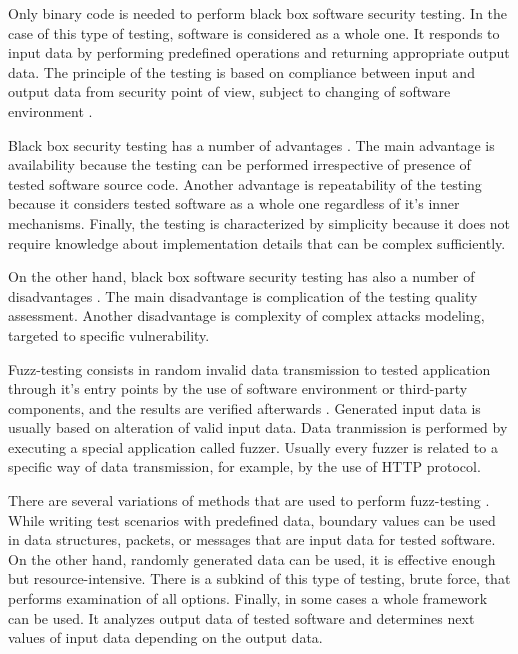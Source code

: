 %
Only binary code is needed to perform black box software security testing. 
%
In the case of this type of testing, software is considered as a whole one. 
%
It responds to input data by performing predefined operations and returning appropriate output data. 
%
The principle of the testing is based on compliance between input and output data from security point of view, subject to changing of software environment . 

%
Black box security testing has a number of advantages . 
%
The main advantage is availability because the testing can be performed irrespective of presence of tested software source code. 
%
Another advantage is repeatability of the testing because it considers tested software as a whole one regardless of it's inner mechanisms. 
%
Finally, the testing is characterized by simplicity because it does not require knowledge about implementation details that can be complex sufficiently. 

%
On the other hand, black box software security testing has also a number of disadvantages . 
%
The main disadvantage is complication of the testing quality assessment. 
%
Another disadvantage is complexity of complex attacks modeling, targeted to \A specific vulnerability. 



%
Fuzz-testing consists in random invalid data transmission to \A tested application through it's entry points by the use of software environment or third-party components, and the results are verified afterwards . 
%
Generated input data is usually based on alteration of valid input data. 
%
Data tranmission is performed by executing a special application called fuzzer. 
%
Usually every fuzzer is related to a specific way of data transmission, for example, by the use of HTTP protocol. 

%
There are several variations of methods that are used to perform fuzz-testing . 
%
While writing test scenarios with predefined data, boundary values can be used in data structures, packets, or messages that are input data for tested software. 
%
On the other hand, randomly generated data can be used, it is effective enough but resource-intensive. 
%
There is a subkind of this type of testing, brute force, that performs examination of all options. 
%
Finally, in some cases a whole framework can be used. 
%
It analyzes output data of tested software and determines next values of input data depending on the output data. 

